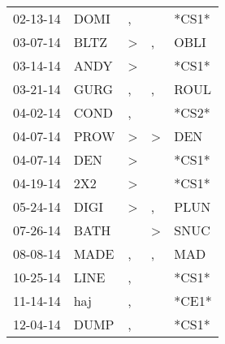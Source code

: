 \begin{supertabular}{p{0.07\textwidth}p{0.06\textwidth}p{0.02\textwidth}p{0.02\textwidth}p{0.06\textwidth}}
          02-13-14\textsuperscript{} &           DOMI\textsuperscript{} &                , &                  &                            *CS1* \\
          03-07-14\textsuperscript{} &           BLTZ\textsuperscript{} &     \textgreater &                , &           OBLI\textsuperscript{} \\
          03-14-14\textsuperscript{} &           ANDY\textsuperscript{} &     \textgreater &                  &                            *CS1* \\
          03-21-14\textsuperscript{} &           GURG\textsuperscript{} &                , &                , &           ROUL\textsuperscript{} \\
          04-02-14\textsuperscript{} &           COND\textsuperscript{} &                , &                  &                            *CS2* \\
          04-07-14\textsuperscript{} &           PROW\textsuperscript{} &     \textgreater &     \textgreater &            DEN\textsuperscript{} \\
          04-07-14\textsuperscript{} &            DEN\textsuperscript{} &     \textgreater &                  &                            *CS1* \\
          04-19-14\textsuperscript{} &            2X2\textsuperscript{} &     \textgreater &                  &                            *CS1* \\
          05-24-14\textsuperscript{} &           DIGI\textsuperscript{} &     \textgreater &                , &           PLUN\textsuperscript{} \\
          07-26-14\textsuperscript{} &           BATH\textsuperscript{} &                  &     \textgreater &           SNUC\textsuperscript{} \\
          08-08-14\textsuperscript{} &           MADE\textsuperscript{} &                , &                , &            MAD\textsuperscript{} \\
          10-25-14\textsuperscript{} &           LINE\textsuperscript{} &                , &                  &                            *CS1* \\
          11-14-14\textsuperscript{} &            haj\textsuperscript{} &                , &                  &                            *CE1* \\
          12-04-14\textsuperscript{} &           DUMP\textsuperscript{} &                , &                  &                            *CS1* \\

\end{supertabular}
